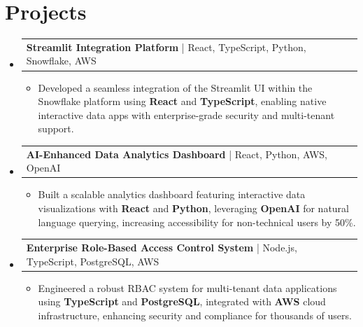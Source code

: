 \documentclass[letterpaper,10pt]{article}
\makeatletter
\newcommand{\resumeItem}[1]{
  \item{\fontsize{8pt}{9pt}\selectfont
    #1 \vspace{-3pt}
  }
}
\newcommand{\resumeProjectHeading}[2]{
    \item
    \begin{tabular*}{1.001\textwidth}{l@{\extracolsep{\fill}}r}
      \fontsize{8.5pt}{10pt}#1 & \textbf{\fontsize{8.5pt}{10pt} #2}\\
    \end{tabular*}\vspace{-7pt}
}
\newcommand{\resumeSubHeadingListStart}{\begin{itemize}[leftmargin=0pt, label={}]}
\newcommand{\resumeSubHeadingListEnd}{\end{itemize}}
\newcommand{\resumeItemListStart}{\begin{itemize}[leftmargin=*]}
\newcommand{\resumeItemListEnd}{\end{itemize}\vspace{-5pt}}
\makeatother
\begin{document}
\section{Projects}
    \vspace{-5pt}
    \resumeSubHeadingListStart
          \resumeProjectHeading
            {\textbf{Streamlit Integration Platform} | React, TypeScript, Python, Snowflake, AWS}{}
            \resumeItemListStart
                \resumeItem{Developed a seamless integration of the Streamlit UI within the Snowflake platform using \textbf{React} and \textbf{TypeScript}, enabling native interactive data apps with enterprise-grade security and multi-tenant support.}
            \resumeItemListEnd
        \vspace{-12pt}
    
        \resumeProjectHeading
            {\textbf{AI-Enhanced Data Analytics Dashboard} | React, Python, AWS, OpenAI}{}
        \resumeItemListStart
                \resumeItem{Built a scalable analytics dashboard featuring interactive data visualizations with \textbf{React} and \textbf{Python}, leveraging \textbf{OpenAI} for natural language querying, increasing accessibility for non-technical users by 50\%.}
        \resumeItemListEnd
      \vspace{-12pt}
      \resumeProjectHeading
        {\textbf{Enterprise Role-Based Access Control System} | Node.js, TypeScript, PostgreSQL, AWS}{}
    \resumeItemListStart
            \resumeItem{Engineered a robust RBAC system for multi-tenant data applications using \textbf{TypeScript} and \textbf{PostgreSQL}, integrated with \textbf{AWS} cloud infrastructure, enhancing security and compliance for thousands of users.}
    \resumeItemListEnd
    \resumeSubHeadingListEnd
\end{document}
